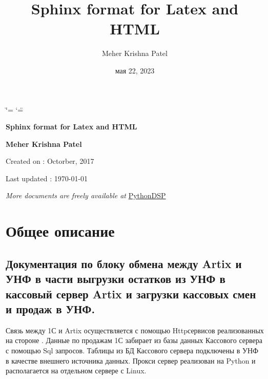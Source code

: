 \documentclass[a4paper,10pt,russian]{report}
\title{Sphinx format for Latex and HTML}
\date{мая 22, 2023}
\author{Meher Krishna Patel}
\begin{document}
\ifdefined\shorthandoff
  \ifnum\catcode`\=\string=\active\shorthandoff{=}\fi
  \ifnum\catcode`\"=\active{}\fi
\fi

\pagestyle{empty}


        \begin{titlepage}
            \centering

            \vspace*{40mm} %
            \textbf{\Huge {Sphinx format for Latex and HTML}}

            \vspace{0mm}

            \vspace{0mm}
            \Large \textbf{{Meher Krishna Patel}}

            \small Created on : Octorber, 2017

            \vspace*{0mm}
            \small  Last updated : \MonthYearFormat\today


            \vfill
            \small \textit{More documents are freely available at }{\href{http://pythondsp.readthedocs.io/en/latest/pythondsp/toc.html}{PythonDSP}}
        \end{titlepage}

        \clearpage
        \tableofcontents
        \listoffigures
        \listoftables
        \clearpage

        
\pagestyle{plain}
 
\pagestyle{normal}
\label{\detokenize{index::doc}}


\sphinxstepscope


\chapter{Общее описание}
\label{\detokenize{description:id1}}\label{\detokenize{description::doc}}

\section{Документация по блоку обмена между Artix и УНФ в части выгрузки остатков из УНФ в кассовый сервер Artix и загрузки кассовых смен и продаж в УНФ.}
\label{\detokenize{description:artix-artix}}
\sphinxAtStartPar
Связь между 1С и Artix осуществляется с помощью Http\sphinxhyphen{}сервисов реализованных на стороне . Данные по продажам 1С забирает из базы данных
Кассового сервера с помощью Sql запросов. Таблицы из БД Кассового сервера подключены в УНФ в качестве внешнего источника данных.
Прокси сервер реализован на Python и располагается на отдельном сервере с Linux.
\end{document}
